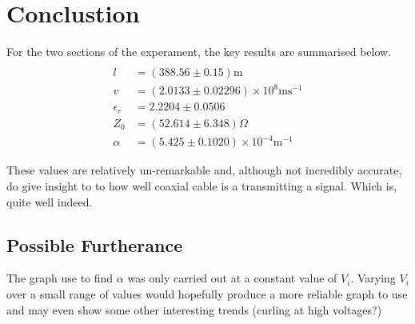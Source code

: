 \section{Conclustion}
For the two sections of the experament, the key results are summarised below.
\begin{align*}\\
l &= (388.56 \pm 0.15) \text{m}\\
v &= (2.0133\pm 0.02296)\times 10^8 \text{ms}^{-1}\\
\epsilon_r &= 2.2204 \pm 0.0506\\
Z_0 &= (52.614\pm6.348)\Omega\\
\alpha &= (5.425 \pm 0.1020)\times 10 ^{-4} \text{m}^{-1}
\end{align*}

These values are relatively un-remarkable and, although not incredibly accurate,
do give insight to to how well coaxial cable is a transmitting a signal. Which
is, quite well indeed.

\subsection{Possible Furtherance}
The graph use to find $\alpha$ was only carried out at a constant value of $V_i$.
Varying $V_i$ over a small range of values would hopefully produce a more reliable 
graph to use and may even show some other interesting trends (curling at high voltages?) 

